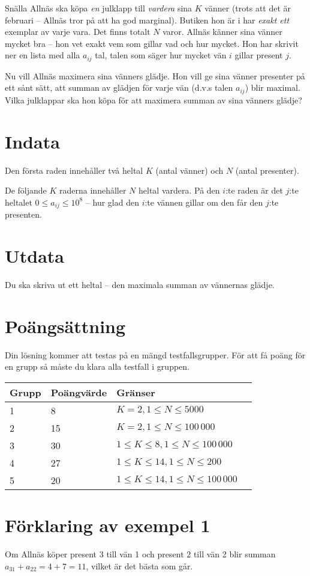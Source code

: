 Snälla Allnäs ska köpa \emph{en} julklapp till \emph{vardera} sina $K$ vänner (trots att det är februari -- Allnäs tror på att ha god marginal).
Butiken hon är i har \emph{exakt ett} exemplar av varje vara.
Det finns totalt $N$ varor.
Allnäs känner sina vänner mycket bra -- hon vet exakt vem som gillar vad och hur mycket.
Hon har skrivit ner en lista med alla $a_{ij}$ tal, talen som säger hur mycket vän $i$ gillar present $j$.

Nu vill Allnäs maximera sina vänners glädje.
Hon vill ge sina vänner presenter på ett sånt sätt, att summan av glädjen för varje vän (d.v.s talen $a_{ij}$) blir maximal.
Vilka julklappar ska hon köpa för att maximera summan av sina vänners glädje?

\section*{Indata}
Den första raden innehåller två heltal $K$ (antal vänner) och $N$ (antal presenter).

De följande $K$ raderna innehåller $N$ heltal vardera.
På den $i$:te raden är det $j$:te heltalet $0 \le a_{ij} \le 10^8$ -- hur glad den $i$:te vännen gillar om den får den $j$:te presenten.

\section*{Utdata}
Du ska skriva ut ett heltal -- den maximala summan av vännernas glädje.

\section*{Poängsättning}
Din lösning kommer att testas på en mängd testfallsgrupper. För att få poäng för en grupp
så måste du klara alla testfall i gruppen.

\begin{tabular}{| l | l | l | l |}
\hline
Grupp & Poängvärde & Gränser \\ \hline
1     & 8          & $K = 2, 1 \le N \le 5000$ \\ \hline
2     & 15         & $K = 2, 1 \le N \le 100\,000$ \\ \hline
3     & 30         & $1 \le K \le 8, 1 \le N \le 100\,000$ \\ \hline
4     & 27         & $1 \le K \le 14, 1 \le N \le 200$ \\ \hline
5     & 20         & $1 \le K \le 14, 1 \le N \le 100\,000$ \\ \hline
\end{tabular}

\section*{Förklaring av exempel 1}
Om Allnäs köper present 3 till vän 1 och present 2 till vän 2 blir summan $a_{31} + a_{22} = 4 + 7 = 11$, vilket är det bästa som går.

